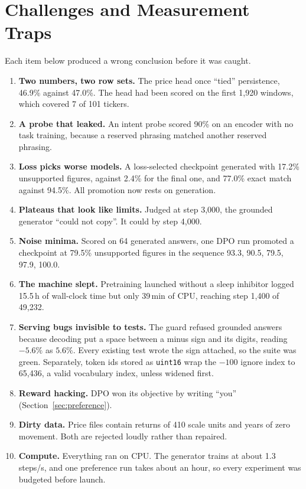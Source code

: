 \documentclass[conference]{IEEEtran}
\begin{document}
\section{Challenges and Measurement Traps}
\label{sec:traps}
Each item below produced a wrong conclusion before it was caught.
\begin{enumerate}
\item \textbf{Two numbers, two row sets.} The price head once ``tied'' persistence, 46.9\% against
47.0\%. The head had been scored on the first 1{,}920 windows, which covered 7 of 101 tickers.
\item \textbf{A probe that leaked.} An intent probe scored 90\% on an encoder with no task training,
because a reserved phrasing matched another reserved phrasing.
\item \textbf{Loss picks worse models.} A loss-selected checkpoint generated with 17.2\% unsupported
figures, against 2.4\% for the final one, and 77.0\% exact match against 94.5\%. All promotion now
rests on generation.
\item \textbf{Plateaus that look like limits.} Judged at step 3{,}000, the grounded generator ``could
not copy''. It could by step 4{,}000.
\item \textbf{Noise minima.} Scored on 64 generated answers, one DPO run promoted a checkpoint at 79.5\%
unsupported figures in the sequence 93.3, 90.5, 79.5, 97.9, 100.0.
\item \textbf{The machine slept.} Pretraining launched without a sleep inhibitor logged 15.5\,h of
wall-clock time but only 39\,min of CPU, reaching step 1{,}400 of 49{,}232.
\item \textbf{Serving bugs invisible to tests.} The guard refused grounded answers because decoding
put a space between a minus sign and its digits, reading $-5.6\%$ as $5.6\%$. Every existing test
wrote the sign attached, so the suite was green. Separately, token ids stored as \texttt{uint16}
wrap the $-100$ ignore index to 65{,}436, a valid vocabulary index, unless widened first.
\item \textbf{Reward hacking.} DPO won its objective by writing ``you'' (Section~\ref{sec:preference}).
\item \textbf{Dirty data.} Price files contain returns of 410 scale units and years of zero
movement. Both are rejected loudly rather than repaired.
\item \textbf{Compute.} Everything ran on CPU. The generator trains at about 1.3 steps/s, and one
preference run takes about an hour, so every experiment was budgeted before launch.
\end{enumerate}
\end{document}

